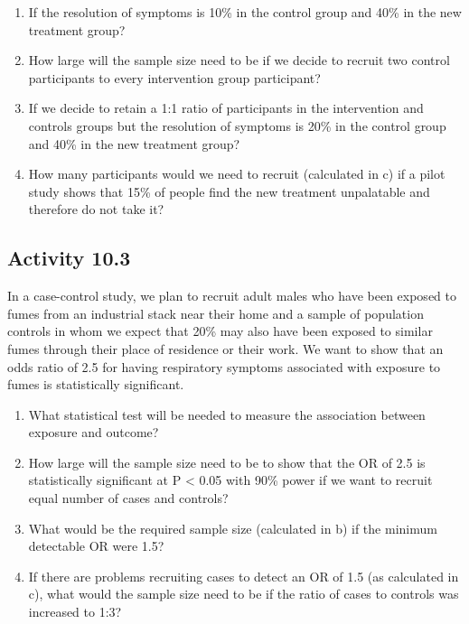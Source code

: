 \documentclass[
]{memoir}
\providecommand{\tightlist}{%
  \setlength{\itemsep}{0pt}\setlength{\parskip}{0pt}}
\begin{document}
\begin{enumerate}
\def\labelenumi{\alph{enumi})}
\tightlist
\item
  If the resolution of symptoms is 10\% in the control group and 40\% in the new treatment group?
\item
  How large will the sample size need to be if we decide to recruit two control participants to every intervention group participant?
\item
  If we decide to retain a 1:1 ratio of participants in the intervention and controls groups but the resolution of symptoms is 20\% in the control group and 40\% in the new treatment group?
\item
  How many participants would we need to recruit (calculated in c) if a pilot study shows that 15\% of people find the new treatment unpalatable and therefore do not take it?
\end{enumerate}

\hypertarget{activity-10.3}{%
\subsection*{Activity 10.3}\label{activity-10.3}}

In a case-control study, we plan to recruit adult males who have been exposed to fumes from an industrial stack near their home and a sample of population controls in whom we expect that 20\% may also have been exposed to similar fumes through their place of residence or their work.
We want to show that an odds ratio of 2.5 for having respiratory symptoms associated with exposure to fumes is statistically significant.

\begin{enumerate}
\def\labelenumi{\alph{enumi})}
\tightlist
\item
  What statistical test will be needed to measure the association between exposure and outcome?
\item
  How large will the sample size need to be to show that the OR of 2.5 is statistically significant at P \textless{} 0.05 with 90\% power if we want to recruit equal number of cases and controls?
\item
  What would be the required sample size (calculated in b) if the minimum detectable OR were 1.5?
\item
  If there are problems recruiting cases to detect an OR of 1.5 (as calculated in c), what would the sample size need to be if the ratio of cases to controls was increased to 1:3?
\end{enumerate}
\end{document}
